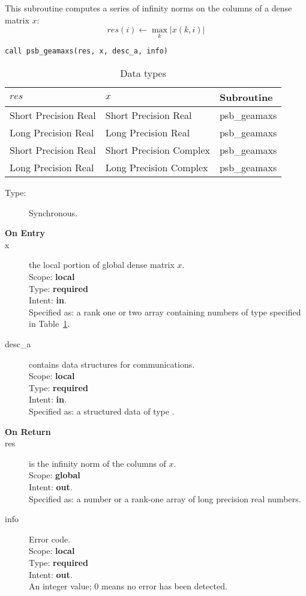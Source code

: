 This subroutine computes a series of  infinity norms on the columns of
a  dense matrix  $x$: 
\[ res(i) \leftarrow \max_k |x(k,i)| \]

\begin{verbatim}
call psb_geamaxs(res, x, desc_a, info)
\end{verbatim}

\begin{table}[h]
\begin{center}
\begin{tabular}{lll}
\hline
$res$&  $x$& {\bf Subroutine}\\
\hline
Short Precision Real    &Short Precision Real    & psb\_geamaxs\\
Long Precision Real    &Long Precision Real    & psb\_geamaxs\\
Short Precision Real &Short Precision Complex & psb\_geamaxs\\	
Long Precision Real &Long Precision Complex & psb\_geamaxs\\	
\hline
\end{tabular}
\end{center}
\caption{Data types\label{tab:f90mamax}}
\end{table}

\begin{description}
\item[Type:] Synchronous.
\item[\bf On Entry]
\item[x] the local portion of global dense matrix
$x$. \\
Scope: {\bf local} \\
Type: {\bf required} \\
Intent: {\bf in}.\\
Specified as: a rank one or two array 
containing numbers of type specified in
Table~\ref{tab:f90mamax}. 
\item[desc\_a] contains data structures for communications.\\
Scope: {\bf local} \\
Type: {\bf required}\\
Intent: {\bf in}.\\
Specified as: a structured data of type \descdata.
\item[\bf On Return] 
\item[res] is the infinity norm of the columns of $x$.\\
Scope: {\bf global} \\
Intent: {\bf out}.\\
Specified as: a number or a rank-one array  of long precision real numbers. 
\item[info] Error code.\\
Scope: {\bf local} \\
Type: {\bf required} \\
Intent: {\bf out}.\\
An integer value; 0 means no error has been detected. 
\end{description}

